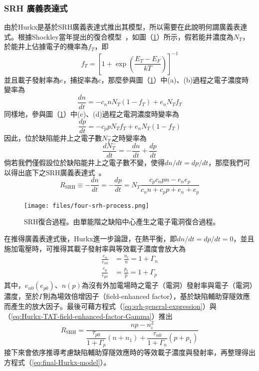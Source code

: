 \subsubsection{SRH 廣義表達式}
由於Hurkx是基於SRH廣義表達式推出其模型，所以需要在此說明何謂廣義表達式。根據Shockley當年提出的復合模型~\cite{shockley1952statistics}，如圖（\ref{fig:four-srh-process}）所示，假若能井濃度為$N_T$，於能井上佔據電子的機率為$f_T$，即
\begin{equation}
f_T=\left[1+\exp\left(\frac{E_T-E_F}{kT}\right)\right]^{-1}
\end{equation}
並且載子發射率為$e$，捕捉率為$c$，那麼參與圖（\ref{fig:four-srh-process}）中(a)、(b)過程之電子濃度時變率為
\begin{equation}
\label{eq:dndt-srh}
\frac{dn}{dt}=-c_nnN_T(1-f_T)+e_nN_Tf_T
\end{equation}
同樣地，參與圖（\ref{fig:four-srh-process}）中(c)、(d)過程之電洞濃度時變率為
\begin{equation}
\label{eq:dpdt-srh}
\frac{dp}{dt}=-c_ppN_Tf_T+e_nN_T(1-f_T)
\end{equation}
因此，位於缺陷能井上之電子數$N_T^-$之時變率為
\begin{equation}
\frac{dN_T^-}{dt}=-\frac{dn}{dt}+\frac{dp}{dt}
\end{equation}
倘若我們僅假設位於缺陷能井上之電子數不變，使得$dn/dt=dp/dt$，那麼我們可以得出底下之SRH廣義表達式~\cite{Hurkx:2004wr}\cite{milnes1973deep}。
\begin{equation}
\label{eq:srh-general-expression}
R_\text{SRH}\equiv-\frac{dn}{dt}=-\frac{dp}{dt}=N_T\frac{c_pc_npn-e_ne_p}{c_nn+c_pp+e_n+e_p}
\end{equation}
\begin{figure}[h]
\centering
\texttt{[image: files/four-srh-process.png]}
\caption[SRH復合過程]{SRH復合過程。由單能階之缺陷中心產生之電子電洞復合過程。}
\label{fig:four-srh-process}
\end{figure}
在推得廣義表達式後，Hurkx進一步論證，在熱平衡，即$dn/dt=dp/dt=0$，並且施加電壓時，可推得其載子發射率與等效載子濃度會放大為
\begin{equation}
\label{eq:Hurkx-TAT-field-enhanced-factor-Gamma}
\begin{aligned}
\frac{e_n}{e_{n0}}&=\frac{n_t}{n}=1+\Gamma_n\\[5pt]
\frac{e_p}{e_{p0}}&=\frac{p_t}{p}=1+\Gamma_p
\end{aligned}
\end{equation}
其中，$e_{n0}(e_{p0})$、$n(p)$為沒有外加電場時之電子（電洞）發射率與電子（電洞）濃度，至於$\Gamma$則為場效倍增因子（field-enhanced factor），基於缺陷輔助穿隧效應而產生的放大因子。最後可藉方程式（\ref{eq:srh-general-expression}）與（\ref{eq:Hurkx-TAT-field-enhanced-factor-Gamma}）推出
\begin{equation}
\label{eq:final-Hurkx-model}
R_\text{SRH}=\frac{np-n_i^2}{\dfrac{\tau_{p0}}{1+\Gamma_p}(n+n_1)+\dfrac{\tau_{n0}}{1+\Gamma_n}(p+p_1)}
\end{equation}
接下來會依序推導考慮缺陷輔助穿隧效應時的等效載子濃度與發射率，再整理得出方程式（\ref{eq:final-Hurkx-model}）。
